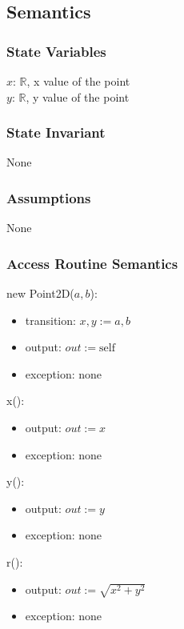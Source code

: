\documentclass[12pt]{article}
\begin{document}
\subsection* {Semantics}

\subsubsection* {State Variables}

$x$: $\mathbb{R}$, x value of the point\\
$y$: $\mathbb{R}$, y value of the point\


\subsubsection* {State Invariant}

None

\subsubsection* {Assumptions}

 None
 
\subsubsection* {Access Routine Semantics}

\noindent new Point2D($a, b$):
\begin{itemize}
\item transition: $x, y := a, b$
\item output: $out := \mbox{self}$
\item exception: none
\end{itemize}

\noindent x():
\begin{itemize}
\item output: $out := x$
\item exception: none
\end{itemize}

\noindent y():
\begin{itemize}
\item output: $out := y$
\item exception: none
\end{itemize}

\noindent r():
\begin{itemize}
\item output: $out := \sqrt{x^2 + y^2}$
\item exception: none
\end{itemize}
\end{document}
